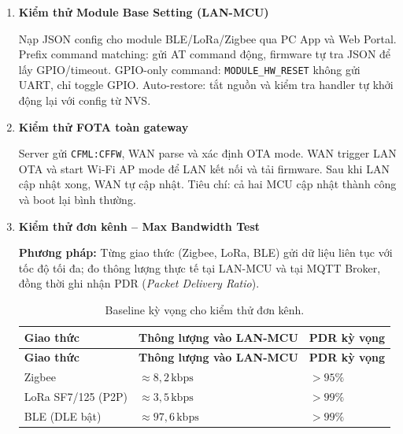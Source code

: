 \begin{enumerate}
            Scan/Read config: PC yêu cầu đọc cấu hình CFSC, WAN trả key--value và mask thông tin nhạy cảm. Config write: PC gửi lệnh có prefix CF, WAN validate, lưu NVS và apply runtime; nếu thuộc LAN thì forward qua SPI. Tiêu chí: cấu hình tồn tại sau reboot và không làm gián đoạn SPI/MQTT.

            \item \textbf{Kiểm thử Module Base Setting (LAN-MCU)}

            Nạp JSON config cho module BLE/LoRa/Zigbee qua PC App và Web Portal. Prefix command matching: gửi AT command động, firmware tự tra JSON để lấy GPIO/timeout. GPIO-only command: \texttt{MODULE\_HW\_RESET} không gửi UART, chỉ toggle GPIO. Auto-restore: tắt nguồn và kiểm tra handler tự khởi động lại với config từ NVS.

            \item \textbf{Kiểm thử FOTA toàn gateway}

            Server gửi \texttt{CFML:CFFW}, WAN parse và xác định OTA mode. WAN trigger LAN OTA và start Wi-Fi AP mode để LAN kết nối và tải firmware. Sau khi LAN cập nhật xong, WAN tự cập nhật. Tiêu chí: cả hai MCU cập nhật thành công và boot lại bình thường.

            \item \textbf{Kiểm thử đơn kênh -- Max Bandwidth Test}

            \textbf{Phương pháp:} Từng giao thức (Zigbee, LoRa, BLE) gửi dữ liệu liên tục với tốc độ tối đa; đo thông lượng thực tế tại LAN-MCU và tại MQTT Broker, đồng thời ghi nhận PDR (\textit{Packet Delivery Ratio}).

            \begin{longtable}{|p{4.5cm}|p{4.5cm}|p{3.5cm}|}
                \caption{Baseline kỳ vọng cho kiểm thử đơn kênh.}
                \label{tab:single_channel_baseline} \\
                \hline
                \textbf{Giao thức} & \textbf{Thông lượng vào LAN-MCU} & \textbf{PDR kỳ vọng} \\ \hline
                \endfirsthead
                \hline
                \textbf{Giao thức} & \textbf{Thông lượng vào LAN-MCU} & \textbf{PDR kỳ vọng} \\ \hline
                \endhead
                \hline
                \endfoot
                \endlastfoot
                Zigbee & $\approx 8{,}2\,\text{kbps}$ & $> 95\%$ \\ \hline
                LoRa SF7/125 (P2P) & $\approx 3{,}5\,\text{kbps}$ & $> 99\%$ \\ \hline
                BLE (DLE bật) & $\approx 97{,}6\,\text{kbps}$ & $> 99\%$ \\ \hline
            \end{longtable}


\end{enumerate}
